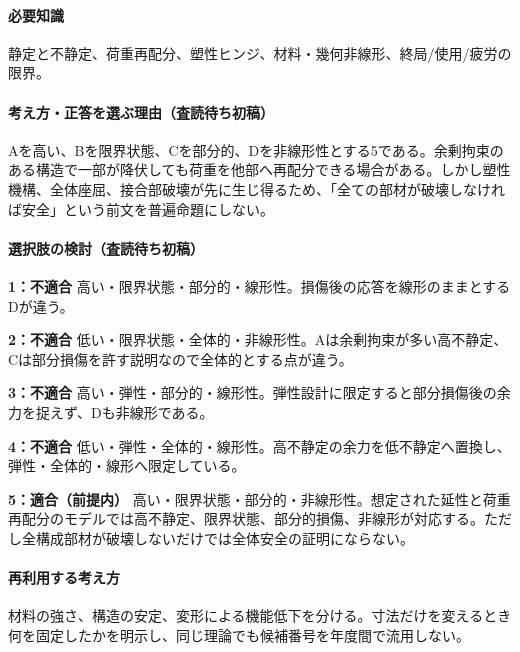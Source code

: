 \paragraph{必要知識} 静定と不静定、荷重再配分、塑性ヒンジ、材料・幾何非線形、終局/使用/疲労の限界。

\paragraph{考え方・正答を選ぶ理由（査読待ち初稿）} Aを高い、Bを限界状態、Cを部分的、Dを非線形性とする5である。余剰拘束のある構造で一部が降伏しても荷重を他部へ再配分できる場合がある。しかし塑性機構、全体座屈、接合部破壊が先に生じ得るため、「全ての部材が破壊しなければ安全」という前文を普遍命題にしない。

\paragraph{選択肢の検討（査読待ち初稿）}\mbox{}\par

\noindent\textbf{1：不適合} 高い・限界状態・部分的・線形性。損傷後の応答を線形のままとするDが違う。\par

\noindent\textbf{2：不適合} 低い・限界状態・全体的・非線形性。Aは余剰拘束が多い高不静定、Cは部分損傷を許す説明なので全体的とする点が違う。\par

\noindent\textbf{3：不適合} 高い・弾性・部分的・線形性。弾性設計に限定すると部分損傷後の余力を捉えず、Dも非線形である。\par

\noindent\textbf{4：不適合} 低い・弾性・全体的・線形性。高不静定の余力を低不静定へ置換し、弾性・全体的・線形へ限定している。\par

\noindent\textbf{5：適合（前提内）} 高い・限界状態・部分的・非線形性。想定された延性と荷重再配分のモデルでは高不静定、限界状態、部分的損傷、非線形が対応する。ただし全構成部材が破壊しないだけでは全体安全の証明にならない。\par

\paragraph{再利用する考え方} 材料の強さ、構造の安定、変形による機能低下を分ける。寸法だけを変えるとき何を固定したかを明示し、同じ理論でも候補番号を年度間で流用しない。

